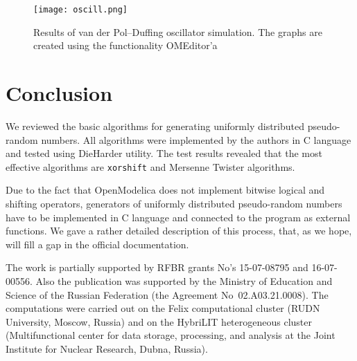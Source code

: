 \documentclass[%
floatfix,
showkeys,
nofootinbib, %
superscriptaddress, %
]{revtex4-1}
\begin{document}
\begin{figure}
  \centering
  \texttt{[image: oscill.png]}
  \caption{Results of van der Pol–Duffing oscillator simulation. The graphs are created using the functionality OMEditor'a}
  \label{fig:vanderpolduff}
\end{figure}


  
\section{Conclusion}

We reviewed the basic algorithms for generating uniformly distributed
pseudo-random numbers. All algorithms were implemented by the authors
in C language and tested using DieHarder utility. The test results
revealed that the most effective algorithms are \texttt{xorshift} and
Mersenne Twister algorithms.

Due to the fact that OpenModelica does not implement bitwise logical
and shifting operators, generators of uniformly distributed
pseudo-random numbers have to be implemented in C language and
connected to the program as external functions. We gave a rather
detailed description of this process, that, as we hope, will fill a
gap in the official documentation.


\begin{acknowledgments}


The work is partially supported by RFBR grants No's 15-07-08795 and 16-07-00556.
Also the publication was supported by the Ministry of Education and
Science of the Russian Federation (the Agreement No~02.A03.21.0008).
The computations were carried out on the Felix computational cluster
(RUDN University, Moscow, Russia) and on the HybriLIT
heterogeneous cluster (Multifunctional center for data storage,
processing, and analysis at the Joint Institute for Nuclear
Research, Dubna, Russia).

\end{acknowledgments}


 


\end{document}
